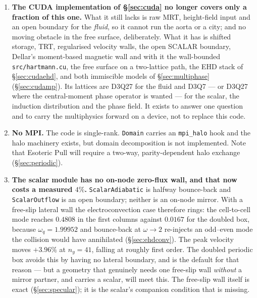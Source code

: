 \documentclass[11pt,a4paper]{article}
\newcommand{\code}[1]{\texttt{\small #1}}
\begin{document}
\begin{enumerate}[leftmargin=1.4em,itemsep=4pt]
\item \textbf{The CUDA implementation of \S\ref{sec:cuda} no longer covers only a
  fraction of this one.} What it still lacks is raw MRT, height-field input and
  an open boundary for the \emph{fluid}, so it cannot run the aorta or a city;
  and no moving obstacle in the free surface, deliberately. What it has is
  shifted storage, TRT, regularised velocity walls, the open SCALAR boundary,
  Dellar's moment-based magnetic wall and with it the wall-bounded
  \code{src/hartmann.cu}, the free surface on a two-lattice path, the EHD stack
  of \S\ref{sec:cudaehd}, and both immiscible models of \S\ref{sec:multiphase}
  (\S\ref{sec:cudamp}). Its lattices are D3Q27 for the fluid and D3Q7 --- or
  D3Q27 where the central-moment phase operator is wanted --- for the scalar, the
  induction distribution and the phase field. It exists to answer one question
  and to carry the multiphysics forward on a device, not to replace this code.

\item \textbf{No MPI.} The code is single-rank. \code{Domain} carries an
  \code{mpi\_halo} hook and the halo machinery exists, but domain decomposition
  is not implemented. Note that Esoteric Pull will require a two-way,
  parity-dependent halo exchange (\S\ref{sec:periodic}).

\item \textbf{The scalar module has no on-node zero-flux wall, and that now
  costs a measured $4\%$.} \code{ScalarAdiabatic} is halfway bounce-back and
  \code{ScalarOutflow} is an open boundary; neither is an on-node mirror. With a
  free-slip lateral wall the electroconvection case therefore rings: the
  cell-to-cell mode reaches $0.4808$ in the first columns against $0.0167$ for
  the doubled box, because $\omega_q=1.99952$ and bounce-back at $\omega\to2$
  re-injects an odd--even mode the collision would have annihilated
  (\S\ref{sec:ehdconv}). The peak velocity moves $+3.96\%$ at $n_y=41$, falling
  at roughly first order. The doubled periodic box avoids this by having no
  lateral boundary, and is the default for that reason --- but a geometry that
  genuinely needs one free-slip wall \emph{without} a mirror partner, and carries
  a scalar, will meet this. The free-slip wall itself is exact
  (\S\ref{sec:specular}); it is the scalar's companion condition that is
  missing.


\end{enumerate}
\end{document}
